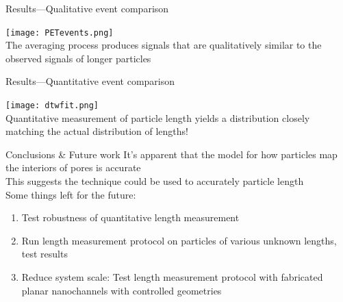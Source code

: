 
\begin{frame}[c]{Results---Qualitative event comparison}
	{\centering
		\texttt{[image: PETevents.png]} \\
		\textcolor{negativered}{The averaging process produces signals that are qualitatively similar to the observed signals of longer particles}
		\par
	}
\end{frame}




\begin{frame}[c]{Results---Quantitative event comparison}
	{\centering
		\texttt{[image: dtwfit.png]} \\
		\textcolor{negativered}{Quantitative measurement of particle length yields a distribution closely matching the actual distribution of lengths!}
		\par
	}
\end{frame}




\begin{frame}[c]{Conclusions \& Future work}
	It's apparent that the model for how particles map the interiors of pores is accurate \\
	This suggests the technique could be used to accurately particle length \\
	Some things left for the future: \\
	\begin{enumerate}
		\item Test robustness of quantitative length measurement
		\item Run length measurement protocol on particles of various unknown lengths, test results
		\item Reduce system scale: Test length measurement protocol with fabricated planar nanochannels with controlled geometries
	\end{enumerate}
\end{frame}



